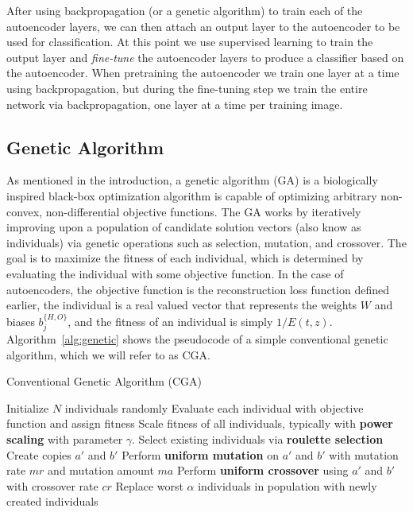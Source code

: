 After using backpropagation (or a genetic algorithm) to train each of the autoencoder layers, we can then attach an output layer to the autoencoder to be used for classification. At this
point we use supervised learning to train the output layer and \textit{fine-tune} the autoencoder layers to produce a classifier based on the autoencoder. When pretraining the autoencoder
we train one layer at a time using backpropagation, but during the fine-tuning step we train the entire network via backpropagation, one layer at a time per training image. 


\subsection{Genetic Algorithm}

As mentioned in the introduction, a genetic algorithm (GA) is a biologically inspired black-box optimization algorithm is capable of optimizing arbitrary non-convex, non-differential objective functions. The GA works by iteratively improving upon a population of candidate solution vectors (also know as individuals) via genetic operations such as selection, mutation, and crossover. The goal is to maximize the fitness of each individual, which is determined by evaluating the individual with some objective function. In the case of autoencoders, the objective function is the reconstruction loss function defined earlier, the individual is a real valued vector that represents the weights $W$ and biases $b_j^{\{H,O\}}$, and the fitness of an individual is simply $1/E(t,z)$. Algorithm~\ref{alg:genetic} shows the pseudocode of a simple conventional genetic algorithm, which we will refer to as CGA. 

\begin{algorithm}[h]
\caption{Conventional Genetic Algorithm (CGA)}
\label{alg:genetic}
\begin{algorithmic}
\STATE Initialize $N$ individuals randomly
	\STATE Evaluate each individual with objective function and assign fitness
	\STATE Scale fitness of all individuals, typically with \textbf{power scaling} with parameter $\gamma$. 
	\STATE Select existing individuals via \textbf{roulette selection}
		\STATE Create copies $a'$ and $b'$
		\STATE Perform \textbf{uniform mutation} on $a'$ and $b'$ with mutation rate $mr$ and mutation amount $ma$
		\STATE Perform \textbf{uniform crossover} using $a'$ and $b'$ with crossover rate $cr$
	\ENDFOR
	\STATE Replace worst $\alpha$ individuals in population with newly created individuals
\ENDFOR
\end{algorithmic}
\end{algorithm}

